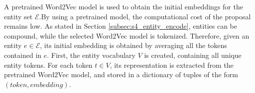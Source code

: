 \begin{table} 
\centering
{}
\caption{Triple classification average precision, recall, and F1 score with and without entity initialization (marked as +SEI)}
\label{tab:exp_entity_init}
\end{table}

A pretrained Word2Vec model is used to obtain the initial embeddings for the entity set $\mathcal{E}$.By using a pretrained model, the computational cost of the proposal remains low. As stated in Section \ref{subsec:s4_entity_encode}, entities can be compound, while the selected Word2Vec model is tokenized. Therefore, given an entity $e \in \mathcal{E}$, its initial embedding is obtained by averaging all the tokens contained in $e$. First, the entity vocabulary $V$ is created, containing all unique entity tokens. For each token $t \in V$, its representation is extracted from the pretrained Word2Vec model, and stored in a dictionary of tuples of the form $(token, embedding)$.

